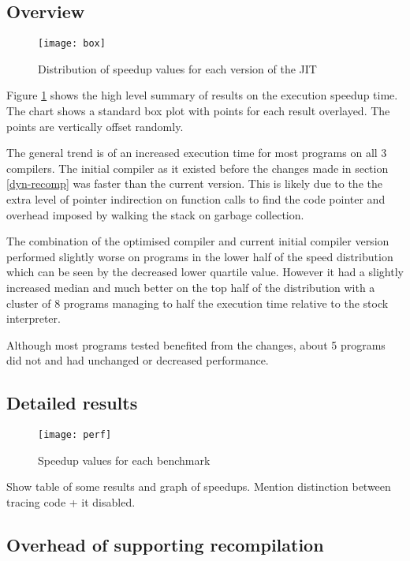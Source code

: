 \subsection{Overview}

\begin{figure}[h]
    \texttt{[image: box]}
    \caption{Distribution of speedup values for each version of the JIT}
    \label{fig:box}
\end{figure}

Figure \ref{fig:box} shows the high level summary of results on the execution speedup time. The
chart shows a standard box plot with points for each result overlayed. The points are vertically
offset randomly.

The general trend is of an increased execution time for most programs on all 3 compilers. The
initial compiler as it existed before the changes made in section \ref{dyn-recomp} was faster than
the current version. This is likely due to the the extra level of pointer indirection on function
calls to find the code pointer and overhead imposed by walking the stack on garbage collection.

The combination of the optimised compiler and current initial compiler version performed slightly
worse on programs in the lower half of the speed distribution  which can be seen by the decreased
lower quartile value.  However it had a slightly increased median and much better on the top half
of the distribution with a cluster of 8 programs managing to half the execution time relative to
the stock interpreter.

Although most programs tested benefited from the changes, about 5 programs did not and had
unchanged or decreased performance.

\subsection{Detailed results}

\begin{landscape}
    \begin{figure}[h]
        \texttt{[image: perf]}
        \caption{Speedup values for each benchmark}
        \label{fig:perf}
    \end{figure}
\end{landscape}

Show table of some results and graph of speedups. Mention distinction between tracing code + it
disabled.

\subsection{Overhead of supporting recompilation}

